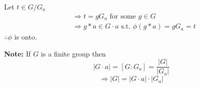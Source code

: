 \documentclass[11pt]{article}
\begin{document}
\noindent Let $t \in G/G_a$
\begin{align*}
&\Rightarrow t = g G_a \text{ for some } g \in G \\
&\Rightarrow g * a \in G \cdot a \text{ s.t. } \phi(g * a) = g G_a = t
\end{align*}
$\therefore \phi$ is onto.

\bigskip
\noindent \textbf{Note:} If $G$ is a finite group then
\[
|G \cdot a| = [G : G_a] = \frac{|G|}{|G_a|}
\]
\[
\Rightarrow \boxed{|G| = |G \cdot a| \cdot |G_a|}
\]
\end{document}
